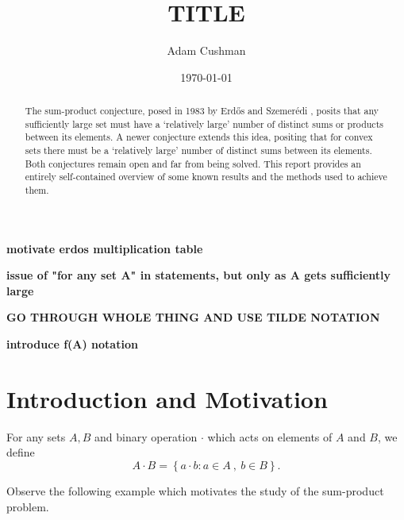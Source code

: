 \documentclass[12pt,reqno]{amsart}
\begin{document}
\title{\textbf{TITLE}} 


\author[Cushman]{Adam Cushman}
\address{Department of Mathematics\\
         Indiana University,
         Bloomington, IN 47405
         USA} 
\date{\today}

\begin{abstract}
The sum-product conjecture, posed in 1983 by Erd{\H{o}}s and Szemer{\'e}di \cite{erdos-szemeredi}, 
posits that any sufficiently large set must have a `relatively large' number
of distinct sums or products between its elements.
A newer conjecture extends this idea, positing that for convex sets there must be a `relatively large'
number of distinct sums between its elements. Both conjectures remain open and far from being solved.
This report provides an entirely self-contained overview of some known results and the methods
used to achieve them.
\end{abstract}

\maketitle


\textbf{motivate erdos multiplication table}

\textbf{issue of "for any set A" in statements, but only as A gets sufficiently large}

\textbf{GO THROUGH WHOLE THING AND USE TILDE NOTATION}

\textbf{introduce f(A) notation}

\section{Introduction and Motivation} 

For any sets \(A,B\) and binary operation \(\cdot \) which acts on elements of \(A\) and \(B\), we define
\[
    A \cdot  B = \left\{ a \cdot  b : a \in A~,~ b \in B \right\} 
.\]

Observe the following example which motivates the study of the sum-product problem.
\end{document}
